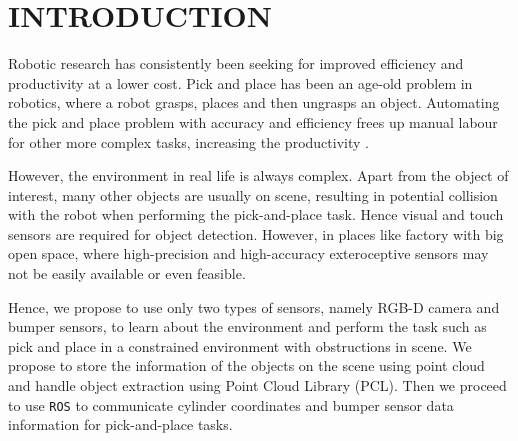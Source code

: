 \section{INTRODUCTION}\label{Sec:intro}

Robotic research has consistently been seeking for improved efficiency and productivity at a lower cost. Pick and place has been an age-old problem in robotics, where a robot grasps, places and then ungrasps an object. Automating the pick and place problem with accuracy and efficiency frees up manual labour for other more complex tasks, increasing the productivity \cite{ifr2017}. 

However, the environment in real life is always complex. Apart from the object of interest, many other objects are usually on scene, resulting in potential collision with the robot when performing the pick-and-place task. Hence visual and touch sensors are required for object detection. However, in places like factory with big open space, where high-precision and high-accuracy exteroceptive sensors may not be easily available or even feasible. 

Hence, we propose to use only two types of sensors, namely RGB-D camera and bumper sensors, to learn about the environment and perform the task such as pick and place in a constrained environment with obstructions in scene. We propose to store the information of the objects on the scene using point cloud and handle object extraction using Point Cloud Library (PCL). Then we proceed to use \texttt{ROS} to communicate cylinder coordinates and bumper sensor data information for pick-and-place tasks.

